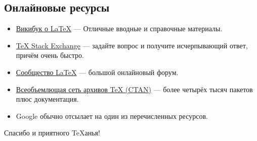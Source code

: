 \documentclass{beamer}
\begin{document}
\subsection{Онлайновые ресурсы}
\begin{frame}{\insertsubsection}
\begin{itemize}
\item \href{http://en.wikibooks.org/wiki/LaTeX}{Викибук о \LaTeX{}} ---
Отличные вводные и справочные материалы.
\item \href{http://tex.stackexchange.com/}{\TeX{} Stack Exchange} --- задайте
вопрос и получите исчерпывающий ответ, причём очень быстро.
\item \href{http://www.latex-community.org/}{Сообщество \LaTeX{}} --- большой
онлайновый форум.
\item \href{http://ctan.org/}{Всеобъемлющая сеть архивов \TeX{} (CTAN)} ---
более четырёх тысяч пакетов плюс документация.
\item Google обычно отсылает на один из перечисленных ресурсов.
\end{itemize}
\end{frame}

\begin{frame}
\begin{center}
Спасибо и приятного \TeX{}анья!
\end{center}
\end{frame}
\end{document}
